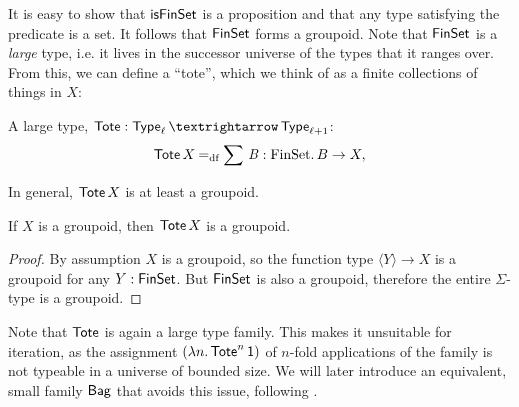 \documentclass[runningheads]{llncs}
\begin{document}
It is easy to show that $\operatorname{\mathsf{isFinSet}}$ is a proposition and that any type satisfying the predicate is a set.
It follows that $\operatorname{\mathsf{FinSet}}$ forms a groupoid.
Note that $\operatorname{\mathsf{FinSet}}$ is a \emph{large} type, i.e. it lives in the successor universe of the types that it ranges over.
From this, we can define a \enquote{tote}, which we think of as a finite collections of things in $X$:
\begin{definition}
  A large type, $\Tote : \Type_\ell → \Type_{\ell + 1}$:
  \begin{align*}
    \operatorname{\mathsf{Tote}} X
      \mathbin{=_{\mathrm{df}}}
      \sum\,\mathit{B} : \operatorname{FinSet}\mathpunct{.} B \to X,
  \end{align*}
\end{definition}

In general, $\operatorname{\mathsf{Tote}} X$ is at least a groupoid.

\begin{proposition}
  If $X$ is a groupoid, then $\operatorname{\mathsf{Tote}} X$ is a groupoid.
\end{proposition}
\begin{proof}
  By assumption $X$ is a groupoid,
  so the function type $\langle Y \rangle → X$ is a groupoid
  for any $Y : \operatorname{\mathsf{FinSet}}$.
  But $\operatorname{\mathsf{FinSet}}$ is also a groupoid, therefore the entire $\Sigma$-type is a groupoid.
\end{proof}

Note that $\operatorname{\mathsf{Tote}}$ is again a large type family.
This makes it unsuitable for iteration, as the assignment $(\lambda n\mathpunct{.} \operatorname{\mathsf{Tote}}^n \mathsf{1})$
of $n$-fold applications of the family is not typeable in a universe of bounded size.
We will later introduce an equivalent, small family $\operatorname{\mathsf{Bag}}$ that avoids this issue, following \cite{Finster2021}.

\end{document}
